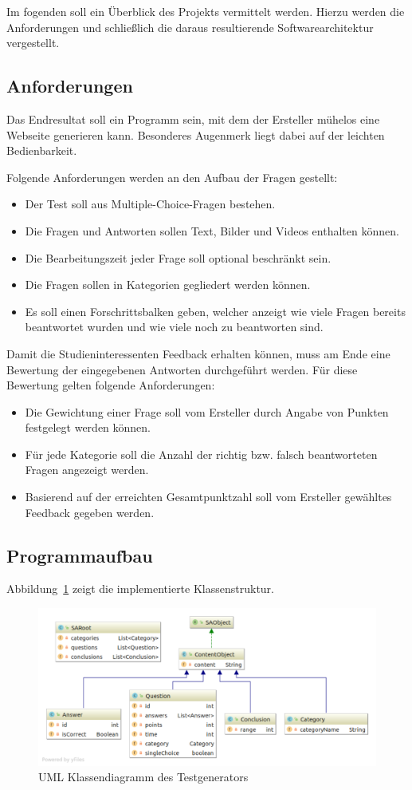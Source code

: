 \label{Architektur}
Im fogenden soll ein Überblick des Projekts vermittelt werden.
Hierzu werden die Anforderungen und schließlich die daraus resultierende Softwarearchitektur vergestellt.

\subsection{Anforderungen}
Das Endresultat soll ein Programm sein, mit dem der Ersteller mühelos eine Webseite generieren kann. 
Besonderes Augenmerk liegt dabei auf der leichten Bedienbarkeit.

Folgende Anforderungen werden an den Aufbau der Fragen gestellt:
\begin{itemize}
	\item Der Test soll aus Multiple-Choice-Fragen bestehen.
	\item Die Fragen und Antworten  sollen Text, Bilder und Videos enthalten können.
	\item Die Bearbeitungszeit jeder Frage soll optional beschränkt sein.
	\item Die Fragen sollen in Kategorien gegliedert werden können.
	\item Es soll einen Forschrittsbalken geben, welcher anzeigt wie viele Fragen bereits beantwortet wurden und wie viele noch zu beantworten sind.
\end{itemize}

Damit die Studieninteressenten Feedback erhalten können, muss am Ende eine Bewertung der eingegebenen Antworten durchgeführt werden.
Für diese Bewertung gelten folgende Anforderungen:
\begin{itemize}
	\item Die Gewichtung einer Frage soll vom Ersteller durch Angabe von Punkten festgelegt werden können.
	\item Für jede Kategorie soll die Anzahl der richtig bzw. falsch beantworteten Fragen angezeigt werden.
	\item Basierend auf der erreichten Gesamtpunktzahl soll vom Ersteller gewähltes Feedback gegeben werden.
\end{itemize}

\subsection{Programmaufbau}
Abbildung~\ref{fig:umlCD} zeigt die implementierte Klassenstruktur.
\begin{figure}\label{fig:umlCD}
	 \centering
	 \caption{UML Klassendiagramm des Testgenerators}
	\includegraphics[width = \textwidth]{domain-class-diagram.pdf}
\end{figure}

